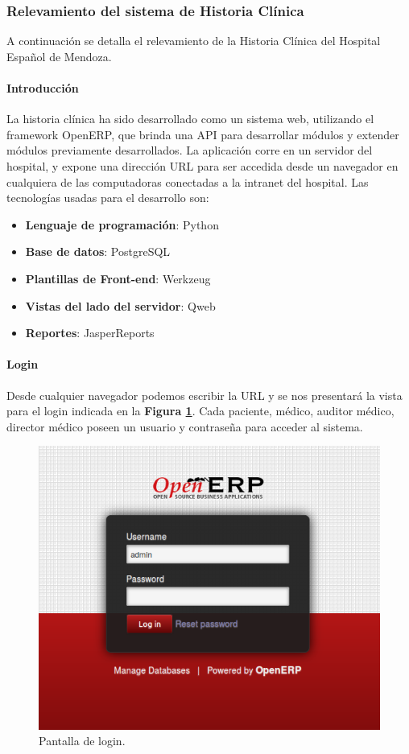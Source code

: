 \subsubsection{Relevamiento del sistema de Historia Clínica}
A continuación se detalla el relevamiento de la Historia Clínica del Hospital Español de Mendoza.

\paragraph{Introducción}

La historia clínica ha sido desarrollado como un sistema web, utilizando el framework OpenERP, que brinda una API para desarrollar módulos y extender módulos previamente desarrollados.
La aplicación corre en un servidor del hospital, y expone una dirección URL para ser accedida desde un navegador en cualquiera de las computadoras conectadas a la intranet del hospital.
Las tecnologías usadas para el desarrollo son:

\begin{itemize}
    \item \textbf{Lenguaje de programación}: Python
    \item \textbf{Base de datos}: PostgreSQL
    \item \textbf{Plantillas de Front-end}: Werkzeug
    \item \textbf{Vistas del lado del servidor}: Qweb
    \item \textbf{Reportes}: JasperReports
\end{itemize}

\paragraph{Login}

Desde cualquier navegador podemos escribir la URL y se nos presentará la vista para el login indicada en la \textbf{Figura \ref{login-sistema}}.
Cada paciente, médico, auditor médico, director médico poseen un usuario y contraseña para acceder al sistema.

\begin{figure}[h]
      \centering
      \includegraphics[width=.8\textwidth]{img/tp1/HE/Login}
      \caption{Pantalla de login.}
      \label{login-sistema}
\end{figure} 



